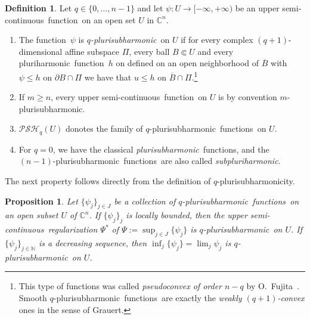 \documentclass[reqno]{amsart}
\newtheorem{prop}[thm]{Proposition}
\theoremstyle{definition}
\newtheorem{defn}[thm]{Definition}
\numberwithin{equation}{section}
\newcommand{\nbb}{\mathbb{N}}
\newcommand{\cbb}{\mathbb{C}}
\newcommand{\ph}{pluri\-harmonic}
\newcommand{\sph}{sub\-pluri\-harmonic}
\newcommand{\psh}{pluri\-sub\-harmonic}
\newcommand{\qpsh}{$q$-pluri\-sub\-harmonic}
\newcommand{\qpshy}{$q$-pluri\-sub\-harmonicity}
\newcommand{\PSH}{\mathcal{PSH}}
\newcommand{\cl}[1]{\overline{#1}}
\newcommand{\nbh}{neighbourhood}
\newcommand{\usc}{upper semi-continuous}
\newcommand{\lsc}{lower semi-continuous}
\newcommand{\fct}{function}
\newcommand{\fcts}{functions}
\newcommand{\relc}{\Subset}
\newcommand{\vphi}{\varphi}
\begin{document}
\begin{defn} \label{def-qpsh}\label{defn-sph} Let $q\in\{ 0,\ldots,n-1\}$ and let $\psi:U\to[-\infty,+\infty)$ be an \usc\ \fct\ on an open set $U$ in $\cbb^n$.
\begin{enumerate}



\item The \fct\ $\psi$ is \emph{\qpsh}\ on $U$ if for every complex $(q+1)$-dimensional affine subspace $\Pi$, every ball $B \relc U$ and every \ph\ \fct\ $h$ on defined on an open neighborhood of $\cl{B}$ with $\psi \leq h$ on $\partial B \cap \Pi$ we have that $u \leq h$ on $\cl{B}\cap \Pi$.\footnote{This type of functions was called \emph{pseudoconvex of order $n-q$} by O.~Fujita~\cite{Fu2}. Smooth \qpsh\ \fcts\ are exactly the \emph{weakly $(q+1)$-convex} ones in the sense of Grauert.}



\item If $m \geq n$, every \usc\ \fct\ on $U$ is by convention $m$-\psh.

\item $\PSH_q(U)$ donotes the family of \qpsh\ \fcts\ on $U$.


\item For $q=0$, we have the classical \textit{\psh}\ \fcts, and the $(n-1)$-\psh\ \fcts\ are also called \textit{subpluriharmonic}. 

\end{enumerate}

\end{defn}

The next property follows directly from the definition of \qpshy.

\begin{prop}\label{prop-sup-inf-qpsh} Let $\{\psi_j\}_{j \in J}$ be a collection of \qpsh\ \fcts\ on an open subset $U$ of $\cbb^n$. If $\{\psi_j\}_j$ is locally bounded, then the \usc\ regularization $\Psi^*$ of $\Psi:=\sup_{j \in J}\{\psi_j\}$ is \qpsh\ on $U$. If $\{\psi_j\}_{j \in \nbb}$ is a decreasing sequence, then $\inf_j\{\psi_j\}=\lim_j \psi_j$ is \qpsh\ on $U$.
\end{prop}
\end{document}
